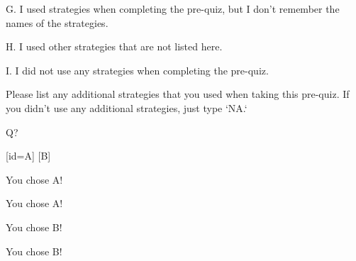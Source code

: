 \documentclass{ximera}
\begin{document}
\begin{problem}
    G. I used strategies when completing the pre-quiz, but I don't remember the names of the strategies.

    \begin{multipleChoice}
    \end{multipleChoice}
    
    H. I used other strategies that are not listed here.

    \begin{multipleChoice}
    \end{multipleChoice}
    
    I. I did not use any strategies when completing the pre-quiz.

    \begin{multipleChoice}
    \end{multipleChoice}

\end{problem}


\begin{problem}
    Please list any additional strategies that you used when taking this pre-quiz. If you didn't use any additional strategies, just type `NA.`
   \begin{freeResponse}
   \end{freeResponse}
\end{problem}

\begin{problem}

Q?

    \begin{multipleChoice}
        [id=A]
        [B]
        
    \begin{feedback}[A]
    You chose A!
    \end{feedback}   
    
    \begin{feedback}[id=A]
    You chose A!
    \end{feedback} 
    
    \begin{feedback}[B]
    You chose B!
     \end{feedback}   
    
    \begin{feedback}[id=B]
    You chose B!
    \end{feedback}
    
    \end{multipleChoice}
   

\end{problem}



%
\end{document}
